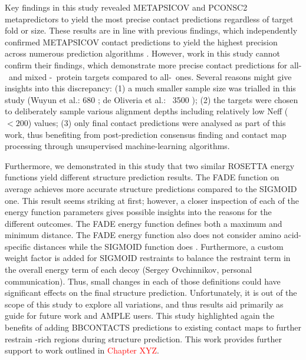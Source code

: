 Key findings in this study revealed METAPSICOV and PCONSC2 metapredictors to yield the most precise contact predictions regardless of target fold or size. These results are in line with previous findings, which independently confirmed METAPSICOV contact predictions to yield the highest precision across numerous prediction algorithms \cite{Wuyun2016-tx, De_Oliveira2017-yf}. However, work in this study cannot confirm their findings, which demonstrate more precise contact predictions for all-\textbeta\ and mixed \textalpha-\textbeta\ protein targets compared to all-\textalpha\ ones. Several reasons might give insights into this discrepancy: (1) a much smaller sample size was trialled in this study (Wuyun et al.: 680 \cite{Wuyun2016-tx}; de Oliveria et al.: ~3500 \cite{De_Oliveira2017-yf}); (2) the targets were chosen to deliberately sample various alignment depths including relatively low Neff ($<200$) values; (3) only final contact predictions were analysed as part of this work, thus benefiting from post-prediction consensus finding and contact map processing through unsupervised machine-learning algorithms.

Furthermore, we demonstrated in this study that two similar ROSETTA energy functions yield different structure prediction results. The FADE function on average achieves more accurate structure predictions compared to the SIGMOID one. This result seems striking at first; however, a closer inspection of each of the energy function parameters gives possible insights into the reasons for the different outcomes. The FADE energy function defines both a maximum and minimum distance. The FADE energy function also does not consider amino acid-specific distances while the SIGMOID function does \cite{Kamisetty2013-bs}. Furthermore, a custom weight factor is added for SIGMOID restraints to balance the restraint term in the overall energy term of each decoy (Sergey Ovchinnikov, personal communication). Thus, small changes in each of those definitions could have significant effects on the final structure prediction. Unfortunately, it is out of the scope of this study to explore all variations, and thus results aid primarily as guide for future work and AMPLE users. This study highlighted again the benefits of adding BBCONTACTS predictions to existing contact maps to further restrain \textbeta-rich regions during structure prediction. This work provides further support to work outlined in \textcolor{red}{Chapter XYZ}.

